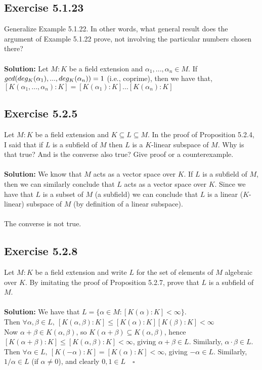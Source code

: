 \documentclass{article}
\begin{document}
\subsection*{Exercise 5.1.23}
Generalize Example 5.1.22. In other words, what
general result does the argument of Example 5.1.22 prove, not involving
the particular numbers chosen there?
\\\\
\textbf{Solution:}
Let $M:K$ be a field extension and $\alpha_1,...,\alpha_n \in M$. If $gcd(deg_K(\alpha_1)\\,...,deg_K(\alpha_n))=1$ (i.e., coprime),
then we have that, $[K(\alpha_1,...,\alpha_n):K] = [K(\alpha_1):K]...[K(\alpha_n):K]$ 

\subsection*{Exercise 5.2.5}
Let $M:K$ be a field extension and $K \subseteq L \subseteq M$. In the proof of Proposition 5.2.4, I said that if $L$ is a
subfield of $M$ then $L$ is a $K$-linear subspace of $M$. Why is that true? And is the converse also true? Give proof or a counterexample.  
\\\\
\textbf{Solution:}
We know that $M$ acts as a vector space over $K$. If $L$ is a subfield of $M$, then we can similarly conclude that $L$ acts as a vector space over $K$.
Since we have that $L$ is a subset of $M$ (a subfield) we can conclude that $L$ is a linear ($K$-linear) subspace of $M$ (by definition of a linear subspace).
\\\\ 
The converse is not true.

\subsection*{Exercise 5.2.8}
Let $M:K$ be a field extension and write $L$ for the set of elements of $M$ algebraic over $K$. By imitating the proof of Proposition 5.2.7,
prove that $L$ is a subfield of $M$.
\\\\
\textbf{Solution:}
We have that $L = \{\alpha \in M: [K(\alpha):K]<\infty\}$.\\
Then $\forall \alpha,\beta \in L,\ [K(\alpha,\beta):K] \leq [K(\alpha):K][K(\beta):K] < \infty$\\
Now $\alpha+\beta \in K(\alpha,\beta)$, so $K(\alpha+\beta) \subseteq K(\alpha,\beta)$, hence \\
$[K(\alpha+\beta):K] \leq [K(\alpha,\beta):K]<\infty$, giving $\alpha+\beta \in L$. Similarly, $\alpha \cdot \beta \in L$.\\
Then $\forall \alpha \in L,\ [K(-\alpha):K] = [K(\alpha):K]<\infty$, giving $-\alpha \in L$.
Similarly, $1/\alpha \in L$ (if $\alpha \neq 0$), and clearly $0,1 \in L \quad \square$
\end{document}
